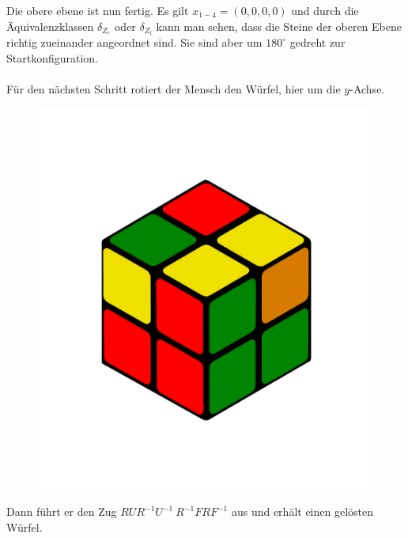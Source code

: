 \documentclass[12pt,a4paper, usenames, dvipsnames]{article}
\begin{document}
Die obere ebene ist nun fertig. Es gilt $x_{1-4} = (0,0,0,0)$ und durch die Äquivalenzklassen $\delta_{Z_r}$ oder $\delta_{Z_l}$ kann man sehen, dass die Steine der oberen Ebene richtig zueinander angeordnet sind. Sie sind aber um $180^\circ$ gedreht zur Startkonfiguration. \\
\\
Für den nächsten Schritt rotiert der Mensch den Würfel, hier um die $y$-Achse. 
\begin{figure}[H]
\centering
\includegraphics[scale=0.12]{menschSchritt4.png}
\caption[Lösung von Mensch: Schritt 4]{}
\end{figure}
Dann führt er den Zug $RUR^{-1}U^{-1} \ R^{-1}FRF^{-1}$ aus \cite{RF2} und erhält einen gelösten Würfel. 
\end{document}
